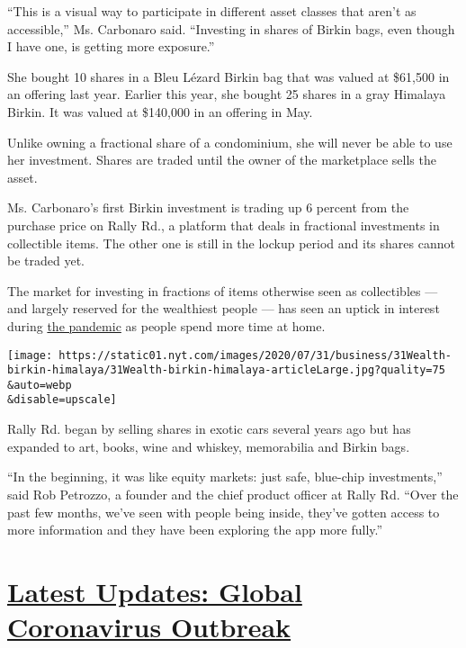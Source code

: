 ``This is a visual way to participate in different asset classes that
aren't as accessible,'' Ms. Carbonaro said. ``Investing in shares of
Birkin bags, even though I have one, is getting more exposure.''

She bought 10 shares in a Bleu Lézard Birkin bag that was valued at
\$61,500 in an offering last year. Earlier this year, she bought 25
shares in a gray Himalaya Birkin. It was valued at \$140,000 in an
offering in May.

Unlike owning a fractional share of a condominium, she will never be
able to use her investment. Shares are traded until the owner of the
marketplace sells the asset.

Ms. Carbonaro's first Birkin investment is trading up 6 percent from the
purchase price on Rally Rd., a platform that deals in fractional
investments in collectible items. The other one is still in the lockup
period and its shares cannot be traded yet.

The market for investing in fractions of items otherwise seen as
collectibles --- and largely reserved for the wealthiest people --- has
seen an uptick in interest during
\href{https://www.nytimes.com/news-event/coronavirus}{the pandemic} as
people spend more time at home.

\texttt{[image: https://static01.nyt.com/images/2020/07/31/business/31Wealth-birkin-himalaya/31Wealth-birkin-himalaya-articleLarge.jpg?quality=75\\\&auto=webp\\\&disable=upscale]}

Rally Rd. began by selling shares in exotic cars several years ago but
has expanded to art, books, wine and whiskey, memorabilia and Birkin
bags.

``In the beginning, it was like equity markets: just safe, blue-chip
investments,'' said Rob Petrozzo, a founder and the chief product
officer at Rally Rd. ``Over the past few months, we've seen with people
being inside, they've gotten access to more information and they have
been exploring the app more fully.''

\hypertarget{latest-updates-global-coronavirus-outbreak}{%
\section{\texorpdfstring{\href{https://www.nytimes.com/2020/08/04/world/coronavirus-cases.html?action=click\&pgtype=Article\&state=default\&region=MAIN_CONTENT_1\&context=storylines_live_updates}{Latest
Updates: Global Coronavirus
Outbreak}}{Latest Updates: Global Coronavirus Outbreak}}\label{latest-updates-global-coronavirus-outbreak}}

